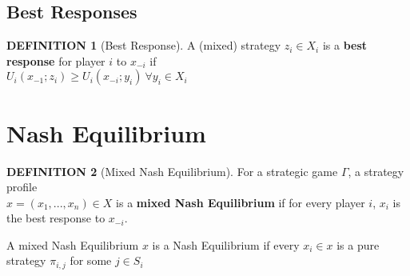 \documentclass[12pt]{article}
\theoremstyle{definition}
\newtheorem*{definition}{DEFINITION}
\begin{document}
    \subsection*{Best Responses}
        \begin{definition}[Best Response]
            A (mixed) strategy $z_i \in X_i$ is a \textbf{best response} for player $i$ to $x_{-i}$ if \\$U_i(x_{-1};z_i) \geq U_i(x_{-i};y_i) \ \forall y_i \in X_i$
        \end{definition}

\section{Nash Equilibrium}
    \begin{definition}[Mixed Nash Equilibrium]
        For a strategic game $\Gamma$, a strategy profile \\$x = (x_1,...,x_n) \in X$ is a \textbf{mixed Nash Equilibrium} if for every player $i$, $x_i$ is the best response to $x_{-i}$.
    \end{definition}
    A mixed Nash Equilibrium $x$ is a Nash Equilibrium if every $x_i \in x$ is a pure strategy $\pi_{i,j}$ for some $j \in S_i$
    
\end{document}
